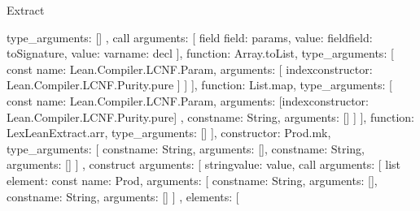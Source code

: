 \begin{lexlean}{Extract}
\begin{toolingmodule}
{{{{{{{{{{{{                                      type_arguments: []
                                    }
                                  },
                                  call{
                                    arguments: [
                                      field{
                                        field: params,
                                        value: field{field: toSignature, value: var{name: decl}}
                                      }
                                    ],
                                    function: Array.toList,
                                    type_arguments: [
                                      const{
                                        name: Lean.Compiler.LCNF.Param,
                                        arguments: [
                                          index{constructor: Lean.Compiler.LCNF.Purity.pure}
                                        ]
                                      }
                                    ]
                                  }
                                ],
                                function: List.map,
                                type_arguments: [
                                  const{
                                    name: Lean.Compiler.LCNF.Param,
                                    arguments: [index{constructor: Lean.Compiler.LCNF.Purity.pure}]
                                  },
                                  const{name: String, arguments: []}
                                ]
                              }
                            ],
                            function: LexLeanExtract.arr,
                            type_arguments: []
                          }
                        ],
                        constructor: Prod.mk,
                        type_arguments: [
                          const{name: String, arguments: []},
                          const{name: String, arguments: []}
                        ]
                      },
                      construct{
                        arguments: [
                          string{value: value},
                          call{
                            arguments: [
                              list{
                                element: const{
                                  name: Prod,
                                  arguments: [
                                    const{name: String, arguments: []},
                                    const{name: String, arguments: []}
                                  ]
                                },
                                elements: [
}}}}}}}}}}
\end{toolingmodule}
\end{lexlean}

